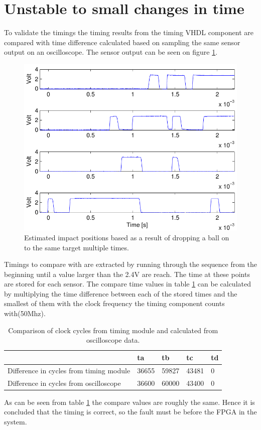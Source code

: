 \section{Unstable to small changes in time}
To validate the timings the timing results from the timing VHDL component are compared with time difference calculated based on sampling the same sensor output on an oscilloscope. The sensor output can be seen on figure \ref{fig:timingPlot}.
\begin{figure}[htb]
	\centering
	\includegraphics[width=.8\textwidth]{figures/timingPlot.pdf}
	\caption{Estimated impact positions based as a result of dropping a ball on to the same target multiple times.}
	\label{fig:timingPlot}
\end{figure}
Timings to compare with are extracted by running through the sequence from the beginning until a value larger than the 2.4V are reach. The time at these points are stored for each sensor. The compare time values in table \ref{tbl:compareCycles} can be calculated by multiplying the time difference between each of the stored times and the smallest of them with the clock frequency the timing component counts with(50Mhz).
%
\begin{table}[h]
	\begin{tabular}{|l|l|l|l|l|}
		\hline
		 & ta & tb & tc & td \\
		 \hline
		Difference in cycles from timing module & 36655 & 59827 & 43481 & 0 \\
		 \hline
		Difference in cycles from oscilloscope & 36600 &  60000 &  43400 & 0 \\
		\hline
	\end{tabular}
	\caption{Comparison of clock cycles from timing module and calculated from oscilloscope data.}
	\label{tbl:compareCycles}
\end{table}
%
As can be seen from table \ref{tbl:compareCycles} the compare values are roughly the same. Hence it is concluded that the timing is correct, so the fault must be before the FPGA in the system.

